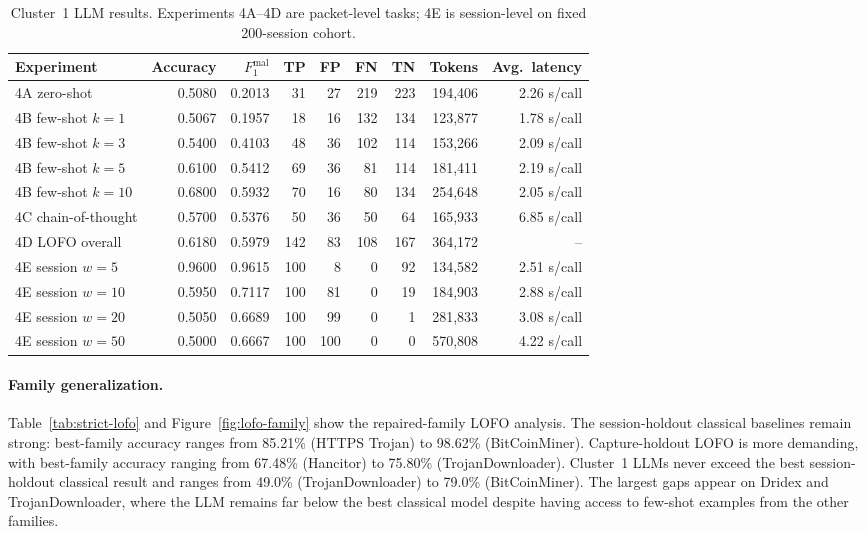 \documentclass[letterpaper,twocolumn,10pt]{article}
\begin{document}
\begin{table}[t]
\centering
\caption{Cluster~1 LLM results. Experiments 4A--4D are packet-level tasks; 4E is session-level on fixed 200-session cohort.}
\label{tab:strict-llm}
\footnotesize
\begin{tabular}{lrrrrrrrr}
\toprule
Experiment & Accuracy & $F_1^{\mathrm{mal}}$ & TP & FP & FN & TN & Tokens & Avg.\ latency \\
\midrule
4A zero-shot   & 0.5080 & 0.2013 & 31  & 27  & 219 & 223 & 194{,}406 & 2.26 s/call \\
4B few-shot $k=1$  & 0.5067 & 0.1957 & 18  & 16  & 132 & 134 & 123{,}877 & 1.78 s/call \\
4B few-shot $k=3$  & 0.5400 & 0.4103 & 48  & 36  & 102 & 114 & 153{,}266 & 2.09 s/call \\
4B few-shot $k=5$  & 0.6100 & 0.5412 & 69  & 36  & 81  & 114 & 181{,}411 & 2.19 s/call \\
4B few-shot $k=10$ & 0.6800 & 0.5932 & 70  & 16  & 80  & 134 & 254{,}648 & 2.05 s/call \\
4C chain-of-thought & 0.5700 & 0.5376 & 50  & 36  & 50  & 64  & 165{,}933 & 6.85 s/call \\
4D LOFO overall  & 0.6180 & 0.5979 & 142 & 83  & 108 & 167 & 364{,}172 & -- \\
4E session $w=5$  & 0.9600 & 0.9615 & 100 & 8   & 0   & 92  & 134{,}582 & 2.51 s/call \\
4E session $w=10$ & 0.5950 & 0.7117 & 100 & 81  & 0   & 19  & 184{,}903 & 2.88 s/call \\
4E session $w=20$ & 0.5050 & 0.6689 & 100 & 99  & 0   & 1   & 281{,}833 & 3.08 s/call \\
4E session $w=50$ & 0.5000 & 0.6667 & 100 & 100 & 0   & 0   & 570{,}808 & 4.22 s/call \\
\bottomrule
\end{tabular}
\end{table}

\paragraph{Family generalization.}
Table~\ref{tab:strict-lofo} and Figure~\ref{fig:lofo-family} show the repaired-family LOFO analysis. The session-holdout classical baselines remain strong: best-family accuracy ranges from 85.21\% (HTTPS Trojan) to 98.62\% (BitCoinMiner). Capture-holdout LOFO is more demanding, with best-family accuracy ranging from 67.48\% (Hancitor) to 75.80\% (TrojanDownloader). Cluster~1 LLMs never exceed the best session-holdout classical result and ranges from 49.0\% (TrojanDownloader) to 79.0\% (BitCoinMiner). The largest gaps appear on Dridex and TrojanDownloader, where the LLM remains far below the best classical model despite having access to few-shot examples from the other families.
\end{document}
